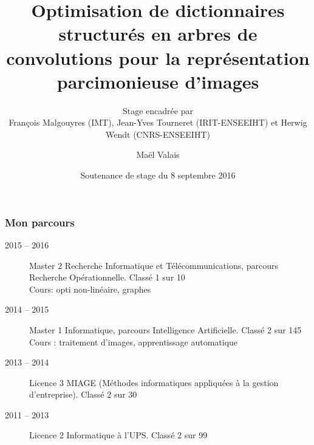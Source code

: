 


\title{Optimisation de dictionnaires structurés en arbres de convolutions pour la représentation parcimonieuse d'images}
\subtitle{Stage encadrée par\\François Malgouyres (IMT), Jean-Yves Tourneret (IRIT-ENSEEIHT) et Herwig Wendt (CNRS-ENSEEIHT)}

\date{Soutenance de stage du 8 septembre 2016}
\author{Maël Valais}



\maketitle








\begin{frame}[label=LO]
\frametitle{Mon parcours}
\begin{description}
\item[2015 – 2016] Master 2 Recherche Informatique et Télécommunications, parcours Recherche Opérationnelle. Classé \alert{1\ier} sur 10\\Cours: \alert{opti non-linéaire}, graphes
\item[2014 – 2015] Master 1 Informatique, parcours Intelligence Artificielle. Classé \alert{2\ieme} sur 145\\
Cours : \alert{traitement d'images}, apprentissage automatique
\item[2013 – 2014] Licence 3 MIAGE (Méthodes informatiques appliquées à la gestion d'entreprise). Classé \alert{2\ieme} sur 30
\item[2011 – 2013] Licence 2 Informatique à l'UPS. Classé \alert{2\ieme} sur 99
\end{description}
\end{frame}





